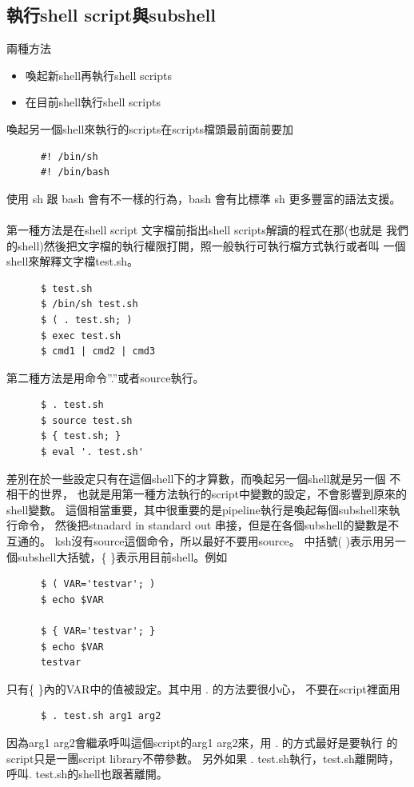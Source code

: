    \subsection{執行shell script與subshell}
    兩種方法
    \begin{itemize}
    \item 喚起新shell再執行shell scripts
    \item 在目前shell執行shell scripts
    \end{itemize}
    喚起另一個shell來執行的scripts在scripts檔頭最前面前要加
    \begin{verbatim}
      #! /bin/sh
      #! /bin/bash
    \end{verbatim}
    使用 sh 跟 bash 會有不一樣的行為，bash 會有比標準 sh 更多豐富的語法支援。
    \\\\
    第一種方法是在shell script 文字檔前指出shell scripts解讀的程式在那(也就是
    我們的shell)然後把文字檔的執行權限打開，照一般執行可執行檔方式執行或者叫
    一個shell來解釋文字檔test.sh。
    \begin{verbatim}
      $ test.sh
      $ /bin/sh test.sh
      $ ( . test.sh; )
      $ exec test.sh
      $ cmd1 | cmd2 | cmd3
    \end{verbatim}
    第二種方法是用命令''.''或者source執行。
    \begin{verbatim}
      $ . test.sh
      $ source test.sh
      $ { test.sh; }
      $ eval '. test.sh'
    \end{verbatim}
    差別在於一些設定只有在這個shell下的才算數，而喚起另一個shell就是另一個
    不相干的世界，
    也就是用第一種方法執行的script中變數的設定，不會影響到原來的shell變數。
    這個相當重要，其中很重要的是pipeline執行是喚起每個subshell來執行命令，
    然後把stnadard in standard out 串接，但是在各個subshell的變數是不互通的。
    ksh沒有source這個命令，所以最好不要用source。
    中括號( )表示用另一個subshell大括號，\{ \}表示用目前shell。例如
    \begin{verbatim}
      $ ( VAR='testvar'; )
      $ echo $VAR

      $ { VAR='testvar'; }
      $ echo $VAR
      testvar
    \end{verbatim}
    只有\{ \}內的VAR中的值被設定。其中用 . 的方法要很小心，
    不要在script裡面用
    \begin{verbatim}
      $ . test.sh arg1 arg2
    \end{verbatim}
    因為arg1 arg2會繼承呼叫這個script的arg1 arg2來，用 . 的方式最好是要執行
    的script只是一團script library不帶參數。
    另外如果 . test.sh執行，test.sh離開時，呼叫. test.sh的shell也跟著離開。

